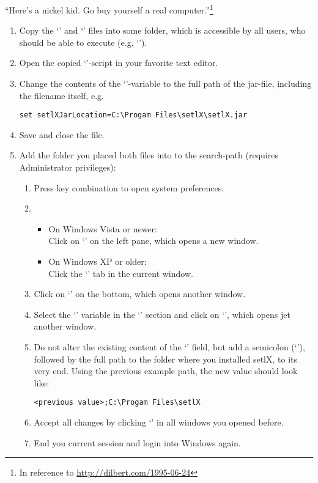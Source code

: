 \begin{center}
\large
``Here's a nickel kid. Go buy yourself a real computer.''\footnote{In reference to \url{http://dilbert.com/1995-06-24}}
\end{center}

\begin{enumerate}
	\item Copy the `' and `' files into some folder, which is accessible by all users, who should be able to execute \setlX{} (e.g. `').
	\item Open the copied `'-script in your favorite text editor.
	\item Change the contents of the `'-variable to the full path of the jar-file, including the filename itself, e.g.
\begin{lstlisting}[frame=none,numbers=none]
set setlXJarLocation=C:\Progam Files\setlX\setlX.jar
\end{lstlisting}
	\item Save and close the file.
	\item Add the folder you placed both files into to the search-path (requires Administrator privileges):
	\begin{enumerate}
		\item Press \command{[Win]+[Pause]} key combination to open system preferences.
		\item 
		\begin{itemize}
			\item On Windows Vista or newer:\\Click on `' on the left pane, which opens a new window.
			\item On Windows XP or older:\\Click the `' tab in the current window.
		\end{itemize}
		\item Click on `' on the bottom, which opens another window.
		\item Select the `' variable in the `' section and click on `', which opens jet another window.
		\item Do not alter the existing content of the `' field, but add a semicolon (`\command{;}'), followed by the full path to the folder where you installed setlX, to its very end. Using the previous example path, the new value should look like:
\begin{lstlisting}[frame=none,numbers=none]
<previous value>;C:\Progam Files\setlX
\end{lstlisting}
		\item Accept all changes by clicking `' in all windows you opened before.
		\item End you current session and login into Windows again.
	\end{enumerate}
\end{enumerate}

